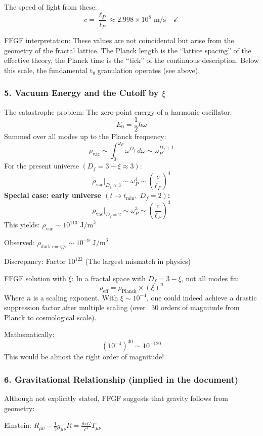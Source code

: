 	The speed of light from these:
	\[
	c = \frac{\ell_P}{t_P} \approx 2.998 \times 10^8 \text{ m/s} \quad \checkmark
	\]
	
	FFGF interpretation:
	These values are not coincidental but arise from the geometry of the fractal lattice. The Planck length is the ``lattice spacing'' of the effective theory, the Planck time is the ``tick'' of the continuous description. Below this scale, the fundamental t₀ granulation operates (see above).
	
	\subsubsection{5. Vacuum Energy and the Cutoff by \( \xi \)}
	The catastrophe problem:
	The zero-point energy of a harmonic oscillator:
	\[
	E_0 = \frac{1}{2}\hbar\omega
	\]
	Summed over all modes up to the Planck frequency:
	\[
	\rho_{\text{vac}} \sim \int_0^{\omega_P} \omega^{D_f} \, d\omega \sim \omega_P^{D_f+1}
	\]
	For the present universe \((D_f = 3-\xi \approx 3)\):
	\[
	\rho_{\text{vac}}\big|_{D_f \approx 3} \sim \omega_P^4 \sim \left(\frac{c}{\ell_P}\right)^4
	\]
	\textbf{Special case: early universe \((t \to t_{\min},\; D_f = 2)\):}
	\[
	\rho_{\text{vac}}\big|_{D_f=2} \sim \omega_P^3 \sim \left(\frac{c}{\ell_P}\right)^3
	\]
	This yields: \( \rho_{\text{vac}} \sim 10^{113} \text{ J/m}^3 \)
	
	Observed: \( \rho_{\text{dark energy}} \sim 10^{-9} \text{ J/m}^3 \)
	
	Discrepancy: Factor \( 10^{122} \) (The largest mismatch in physics)
	
	FFGF solution with \( \xi \):
	In a fractal space with \( D_f = 3 - \xi \), not all modes fit:
	\[
	\rho_{\text{eff}} = \rho_{\text{Planck}} \times (\xi)^n
	\]
	Where \( n \) is a scaling exponent. With \( \xi \sim 10^{-4} \), one could indeed achieve a drastic suppression factor after multiple scaling (over ~30 orders of magnitude from Planck to cosmological scale).
	
	Mathematically:
	\[
	(10^{-4})^{30} \sim 10^{-120}
	\]
	This would be almost the right order of magnitude!
	
	\subsubsection{6. Gravitational Relationship (implied in the document)}
	Although not explicitly stated, FFGF suggests that gravity follows from geometry:
	
	Einstein: \( R_{\mu\nu} - \frac{1}{2}g_{\mu\nu}R = \frac{8\pi G}{c^4} T_{\mu\nu} \)
	
